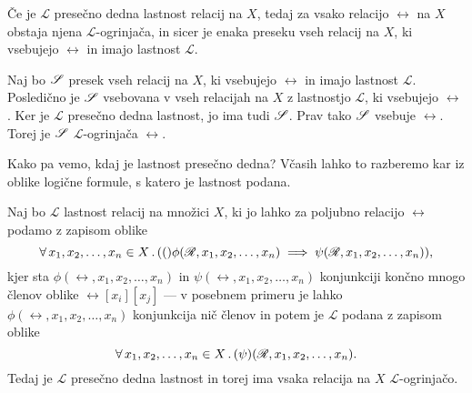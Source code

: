                 \begin{trditev}\label{trditev:obstoj-ogrinjace-iz-presecne-dednosti}
                        Če je $\mathscr{L}$ presečno dedna lastnost relacij na $X$, tedaj za vsako relacijo $\rel$ na $X$ obstaja njena $\mathscr{L}$-ogrinjača, in sicer je enaka preseku vseh relacij na $X$, ki vsebujejo $\rel$ in imajo lastnost $\mathscr{L}$.
                \end{trditev}

                \begin{dokaz}
                        Naj bo $\srel$ presek vseh relacij na $X$, ki vsebujejo $\rel$ in imajo lastnost $\mathscr{L}$. Posledično je $\srel$ vsebovana v vseh relacijah na $X$ z lastnostjo $\mathscr{L}$, ki vsebujejo $\rel$. Ker je $\mathscr{L}$ presečno dedna lastnost, jo ima tudi $\srel$. Prav tako $\srel$ vsebuje $\rel$. Torej je $\srel$ $\mathscr{L}$-ogrinjača $\rel$.
                \end{dokaz}

                Kako pa vemo, kdaj je lastnost presečno dedna? Včasih lahko to razberemo kar iz oblike logične formule, s katero je lastnost podana.

                \begin{izrek}\label{izrek:presecna-dednost-iz-logicne-oblike}
                        Naj bo $\mathscr{L}$ lastnost relacij na množici $X$, ki jo lahko za poljubno relacijo $\rel$ podamo z zapisom oblike
                        \[\all{x_1, x_2, \ldots, x_n \in X} (\phi(\rel, x_1, x_2, \ldots, x_n) \implies \psi(\rel, x_1, x_2, \ldots, x_n)),\]
                        kjer sta $\phi(\rel, x_1, x_2, \ldots, x_n)$ in $\psi(\rel, x_1, x_2, \ldots, x_n)$ konjunkciji končno mnogo členov oblike $\rel[x_i][x_j]$ --- v posebnem primeru je lahko $\phi(\rel, x_1, x_2, \ldots, x_n)$ konjunkcija nič členov in potem je $\mathscr{L}$ podana z zapisom oblike
                        \[\all{x_1, x_2, \ldots, x_n \in X} \psi(\rel, x_1, x_2, \ldots, x_n).\]
                        Tedaj je $\mathscr{L}$ presečno dedna lastnost in torej ima vsaka relacija na $X$ $\mathscr{L}$-ogrinjačo.
                \end{izrek}

